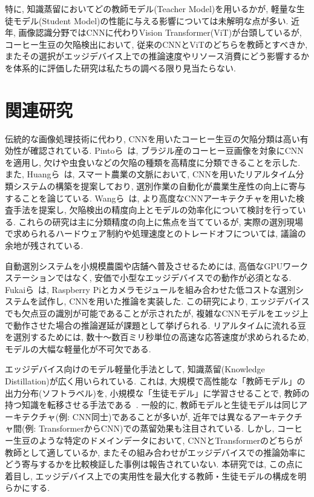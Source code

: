 特に, 知識蒸留においてどの教師モデル(Teacher Model)を用いるかが, 軽量な生徒モデル(Student Model)の性能に与える影響については未解明な点が多い. 
近年, 画像認識分野ではCNNに代わりVision Transformer(ViT)が台頭しているが, コーヒー生豆の欠陥検出において, 従来のCNNとViTのどちらを教師とすべきか, またその選択がエッジデバイス上での推論速度やリソース消費にどう影響するかを体系的に評価した研究は私たちの調べる限り見当たらない.

\section{関連研究}
伝統的な画像処理技術に代わり, CNNを用いたコーヒー生豆の欠陥分類は高い有効性が確認されている. 
Pintoら~\cite{pinto2017classification}は, ブラジル産のコーヒー豆画像を対象にCNNを適用し, 欠けや虫食いなどの欠陥の種類を高精度に分類できることを示した. 
また, Huangら~\cite{huang2020smart}は, スマート農業の文脈において, CNNを用いたリアルタイム分類システムの構築を提案しており, 選別作業の自動化が農業生産性の向上に寄与することを論じている. 
Wangら~\cite{wang2021deep}は, より高度なCNNアーキテクチャを用いた検査手法を提案し, 欠陥検出の精度向上とモデルの効率化について検討を行っている. 
これらの研究は主に分類精度の向上に焦点を当てているが, 実際の選別現場で求められるハードウェア制約や処理速度とのトレードオフについては, 議論の余地が残されている.

自動選別システムを小規模農園や店舗へ普及させるためには, 高価なGPUワークステーションではなく, 安価で小型なエッジデバイスでの動作が必須となる. 
Fukaiら~\cite{fukai2018classification}は, Raspberry Piとカメラモジュールを組み合わせた低コストな選別システムを試作し, CNNを用いた推論を実装した. 
この研究により, エッジデバイスでも欠点豆の識別が可能であることが示されたが, 複雑なCNNモデルをエッジ上で動作させた場合の推論遅延が課題として挙げられる. 
リアルタイムに流れる豆を選別するためには, 数十〜数百ミリ秒単位の高速な応答速度が求められるため, モデルの大幅な軽量化が不可欠である.

エッジデバイス向けのモデル軽量化手法として, 知識蒸留(Knowledge Distillation)が広く用いられている. 
これは, 大規模で高性能な「教師モデル」の出力分布(ソフトラベル)を, 小規模な「生徒モデル」に学習させることで, 教師の持つ知識を転移させる手法である~\cite{hinton2015distilling}. 
一般的に, 教師モデルと生徒モデルは同じアーキテクチャ(例: CNN同士)であることが多いが, 近年では異なるアーキテクチャ間(例: TransformerからCNN)での蒸留効果も注目されている. 
しかし, コーヒー生豆のような特定のドメインデータにおいて, CNNとTransformerのどちらが教師として適しているか, またその組み合わせがエッジデバイスでの推論効率にどう寄与するかを比較検証した事例は報告されていない. 
本研究では, この点に着目し, エッジデバイス上での実用性を最大化する教師・生徒モデルの構成を明らかにする.

